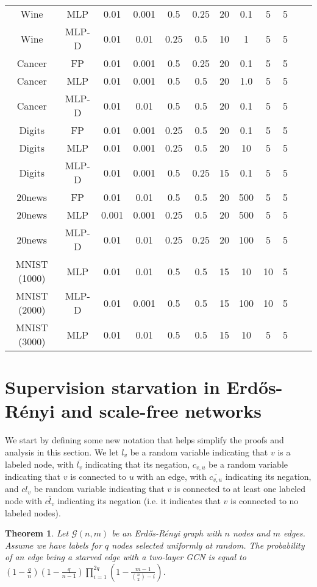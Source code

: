 \documentclass{article}
\newcommand{\graph}[1]{\ensuremath{\mathcal{#1}}}
\newtheorem{theorem}{Theorem}
\begin{document}
\begin{table*}
\begin{center}
\begin{tabular}{c|c|cccccccccc}
Wine & MLP & 0.01 & 0.001 & 0.5 & 0.25 & 20 & 0.1 & 5 & 5\\
Wine & MLP-D & 0.01 & 0.01 & 0.25 & 0.5 & 10 & 1 & 5 & 5\\ \hline
Cancer & FP & 0.01 & 0.001 & 0.5 & 0.25 & 20 & 0.1 & 5 & 5\\
Cancer & MLP & 0.01 & 0.001 & 0.5 & 0.5 & 20 & 1.0 & 5 & 5\\
Cancer & MLP-D & 0.01 & 0.01 & 0.5 & 0.5 & 20 & 0.1 & 5 & 5\\ \hline
Digits & FP & 0.01 & 0.001 & 0.25 & 0.5 & 20 & 0.1 & 5 & 5\\
Digits & MLP & 0.01 & 0.001 & 0.25 & 0.5 & 20 & 10 & 5 & 5\\
Digits & MLP-D & 0.01 & 0.001 & 0.5 & 0.25 & 15 & 0.1 & 5 & 5\\ \hline
20news & FP & 0.01 & 0.01 & 0.5 & 0.5 & 20 & 500 & 5 & 5\\
20news & MLP & 0.001 & 0.001 & 0.25 & 0.5 & 20 & 500 & 5 & 5\\
20news & MLP-D & 0.01 & 0.01 & 0.25 & 0.25 & 20 & 100 & 5 & 5\\
\hline
MNIST (1000) & MLP & 0.01 & 0.01 & 0.5 & 0.5 & 15 & 10 & 10 & 5\\
MNIST (2000) & MLP-D & 0.01 & 0.001 & 0.5 & 0.5 & 15 & 100 & 10 & 5\\
MNIST (3000) & MLP & 0.01 & 0.01 & 0.5 & 0.5 & 15 & 10 & 5 & 5
\end{tabular}
\end{center}
\end{table*}

\section{Supervision starvation in Erd\H{o}s-R\'enyi and scale-free networks}

We start by defining some new notation that helps simplify the proofs and analysis in this section. We let $l_{v}$ be a random variable indicating that $v$ is a labeled node, with $\overline{l_{v}}$ indicating that its negation, $c_{v,u}$ be a random variable indicating that $v$ is connected to $u$ with an edge, with $\overline{c_{v,u}}$ indicating its negation, and $cl_v$ be random variable indicating that $v$ is connected to at least one labeled node with $\overline{cl_v}$ indicating its negation (i.e. it indicates that $v$ is connected to no labeled nodes).  

\begin{theorem}\label{th:main}
Let $\graph{G}(n, m)$ be an Erd\H{o}s-R\'enyi graph with $n$ nodes and $m$ edges. Assume we have labels for $q$ nodes selected uniformly at random. 
The probability of an edge being a starved edge with a two-layer GCN is equal to $(1 - \frac{q}{n})(1 - \frac{q}{n-1})\prod_{i=1}^{2q}(1 - \frac{m-1}{{n \choose 2}-i})$.
\end{theorem}
\end{document}
